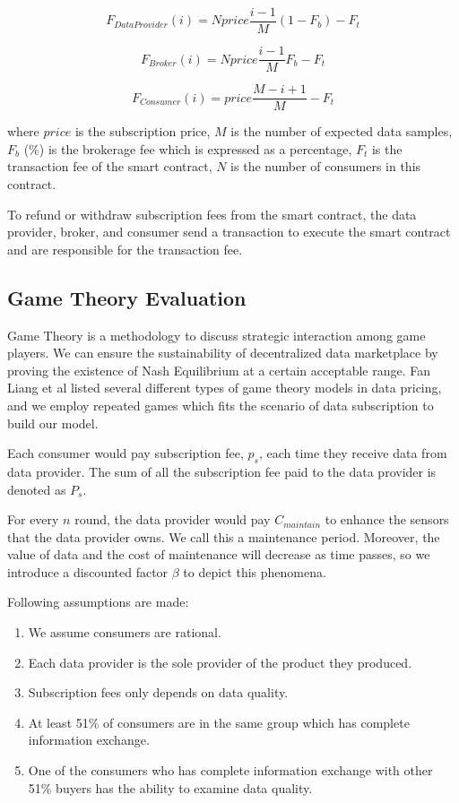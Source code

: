 \documentclass[journal,10pt,a4paper]{IEEEtran}
\begin{document}
\begin{equation}
    F_{DataProvider}(i) = N price \frac{i-1}{M} (1-F_{b}) -F_{t}
\end{equation}

\begin{equation}
    F_{Broker}(i) = N price \frac{i-1}{M} F_{b} -F_{t}
\end{equation}

\begin{equation}
    F_{Consumer}(i) = price \frac{M-i+1}{M} -F_{t}
\end{equation}

where $price$ is the subscription price, $M$ is the number of expected data samples, $F_{b}$ (\%) is the brokerage fee which is expressed as a percentage, $F_{t}$ is the transaction fee of the smart contract, $N$ is the number of consumers in this contract.

To refund or withdraw subscription fees from the smart contract, the data provider, broker, and consumer send a transaction to execute the smart contract and are responsible for the transaction fee.

\subsection{Game Theory Evaluation}
Game Theory is a methodology to discuss strategic interaction among game players. We can ensure the sustainability of decentralized data marketplace by proving the existence of Nash Equilibrium at a certain acceptable range. Fan Liang et al\cite{SurveyBigDataPricing} listed several different types of game theory models in data pricing, and we employ repeated games which fits the scenario of data subscription to build our model.

Each consumer would pay subscription fee, $p_s$, each time they receive data from data provider. The sum of all the subscription fee paid to the data provider is denoted as $P_s$.

For every $n$ round, the data provider would pay $C_{maintain}$ to enhance the sensors that the data provider owns. We call this a maintenance period. Moreover, the value of data and the cost of maintenance will decrease as time passes, so we introduce a discounted factor $\beta$ to depict this phenomena.

Following assumptions are made:
\begin{enumerate}
    \item  We assume consumers are rational. \label{rational_man}
    \item  Each data provider is the sole provider of the product they produced. \label{monopoly}
    \item  Subscription fees only depends on data quality. \label{fee_vs_quality}
    \item  At least 51\% of consumers are in the same group which has complete information exchange.\label{51_in_group}
    \item  One of the consumers who has complete information exchange with other 51\% buyers has the ability to examine data quality. \label{1_in_51}
\end{enumerate}
\end{document}
